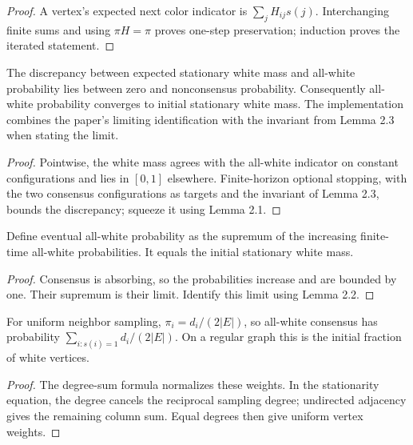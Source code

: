 \begin{proof}\leanok
A vertex's expected next color indicator is $\sum_jH_{ij}s(j)$.
Interchanging finite sums and using $\pi H=\pi$ proves one-step preservation;
induction proves the iterated statement.
\end{proof}
\begin{lemma}\label{lem:22}
\leanok{}
The discrepancy between expected stationary white mass and all-white
probability lies between zero and nonconsensus probability. Consequently
all-white probability converges to initial stationary white mass.
The implementation combines the paper's limiting identification with the
invariant from Lemma 2.3 when stating the limit.
\end{lemma}
\begin{proof}\leanok
Pointwise, the white mass agrees with the all-white indicator on constant
configurations and lies in $[0,1]$ elsewhere. Finite-horizon optional stopping,
with the two consensus configurations as targets and the invariant of Lemma 2.3,
bounds the discrepancy; squeeze it using Lemma 2.1.
\end{proof}
\begin{theorem}[Theorem 2.1]\label{thm:21}
\leanok{}
Define eventual all-white probability as the supremum of the increasing
finite-time all-white probabilities. It equals the initial stationary white mass.
\end{theorem}
\begin{proof}\leanok
Consensus is absorbing, so the probabilities increase and are bounded by one.
Their supremum is their limit. Identify this limit using Lemma 2.2.
\end{proof}
\begin{theorem}\label{cor:22}
\leanok{}
For uniform neighbor sampling, $\pi_i=d_i/(2|E|)$, so all-white consensus has
probability $\sum_{i:s(i)=1}d_i/(2|E|)$. On a regular graph this is the initial
fraction of white vertices.
\end{theorem}
\begin{proof}\leanok
The degree-sum formula normalizes these weights. In the stationarity equation,
the degree cancels the reciprocal sampling degree; undirected adjacency gives
the remaining column sum. Equal degrees then give uniform vertex weights.
\end{proof}

